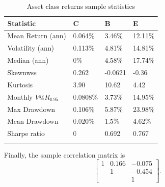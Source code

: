 \begin{table}[H]\label{tab:sampleStatistics}
	\centering
	\begin{tabular}{@{}llll@{}} \toprule
		Statistic & C & B & E \\ \midrule
		Mean Return (ann) & 0.064\%  & 3.46\% & 12.11\%\\
		\addlinespace[0.5em]
		Volatility (ann) & 0.113\%  & 4.81\% & 14.81\% \\
		\addlinespace[0.5em]
		Median (ann) &	0\% & 4.58\% & 17.74\% \\
		\addlinespace[0.5em]
		Skewnwss & 0.262 & -0.0621 & -0.36 \\
		\addlinespace[0.5em]
		Kurtosis & 3.90 & 10.62 & 4.42 \\
		\addlinespace[0.5em]
		Monthly $V@R_{0.95}$ & 0.0808\% & 3.73\% & 14.95\%\\
		\addlinespace[0.5em]
		Max Drawdown & 0.106\% & 5.87\% & 23.98\% \\
		\addlinespace[0.5em]
		Mean Drawdown & 0.020\% & 1.5\% & 4.62\% \\
		\addlinespace[0.5em]
		Sharpe ratio & 0 & 0.692 & 0.767 \\ \bottomrule
		\addlinespace[0.5em]
	\end{tabular}
	\caption{Asset class returns sample statistics}
\end{table}

Finally, the sample correlation matrix is  
\[ 
\begin{bmatrix}
1 & 0.166 & -0.075 \\
  &  1    & -0.454 \\
  &       &  1
\end{bmatrix}.
\]

